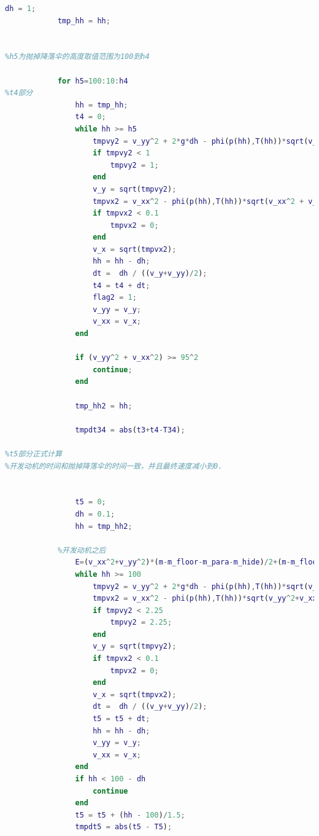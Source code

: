\documentclass[hyperref,a4paper,UTF8]{ctexart}
\begin{document}
\begin{lstlisting}[language=Matlab]
            dh = 1;
            tmp_hh = hh;
        
        
%h5为抛掉降落伞的高度取值范围为100到h4
        
            for h5=100:10:h4
%t4部分
                hh = tmp_hh;
                t4 = 0;
                while hh >= h5               
                    tmpvy2 = v_yy^2 + 2*g*dh - phi(p(hh),T(hh))*sqrt(v_yy^2+v_xx^2)*(S_floor+S_para)*dh*v_yy/(m-m_floor);
                    if tmpvy2 < 1  
                        tmpvy2 = 1;
                    end
                    v_y = sqrt(tmpvy2);
                    tmpvx2 = v_xx^2 - phi(p(hh),T(hh))*sqrt(v_xx^2 + v_yy^2)*(S_floor+S_para)*dh*v_xx^2 / ((m-m_floor) * v_yy);
                    if tmpvx2 < 0.1
                        tmpvx2 = 0;
                    end
                    v_x = sqrt(tmpvx2);
                    hh = hh - dh;
                    dt =  dh / ((v_y+v_yy)/2);
                    t4 = t4 + dt;
                    flag2 = 1;
                    v_yy = v_y;
                    v_xx = v_x;         
                end

                if (v_yy^2 + v_xx^2) >= 95^2 
                    continue;
                end

                tmp_hh2 = hh;

                tmpdt34 = abs(t3+t4-T34);

%t5部分正式计算     
%开发动机的时间和抛掉降落伞的时间一致，并且最终速度减小到0.


                t5 = 0;
                dh = 0.1;
                hh = tmp_hh2;

            %开发动机之后 
                E=(v_xx^2+v_yy^2)*(m-m_floor-m_para-m_hide)/2+(m-m_floor-m_para-m_hide)*g*hh;
                while hh >= 100
                    tmpvy2 = v_yy^2 + 2*g*dh - phi(p(hh),T(hh))*sqrt(v_yy^2+v_xx^2)*S_floor*dh*v_yy/(m-m_floor-m_para-m_hide) - 2*7500*dh*v_yy/((m-m_floor-m_para-m_hide)*sqrt(v_yy^2+v_xx^2));
                    tmpvx2 = v_xx^2 - phi(p(hh),T(hh))*sqrt(v_yy^2+v_xx^2)*S_floor*dh*v_xx^2/(v_yy*(m-m_floor-m_para-m_hide))-2*7500*dh*v_xx^2/(v_yy*sqrt(v_yy^2+v_xx^2)*(m-m_floor-m_para-m_hide));
                    if tmpvy2 < 2.25  
                        tmpvy2 = 2.25;
                    end
                    v_y = sqrt(tmpvy2);
                    if tmpvx2 < 0.1  
                        tmpvx2 = 0;
                    end
                    v_x = sqrt(tmpvx2);
                    dt =  dh / ((v_y+v_yy)/2);
                    t5 = t5 + dt;
                    hh = hh - dh;
                    v_yy = v_y;
                    v_xx = v_x;      
                end
                if hh < 100 - dh
                    continue
                end
                t5 = t5 + (hh - 100)/1.5;
                tmpdt5 = abs(t5 - T5);
                

\end{lstlisting}
\end{document}
